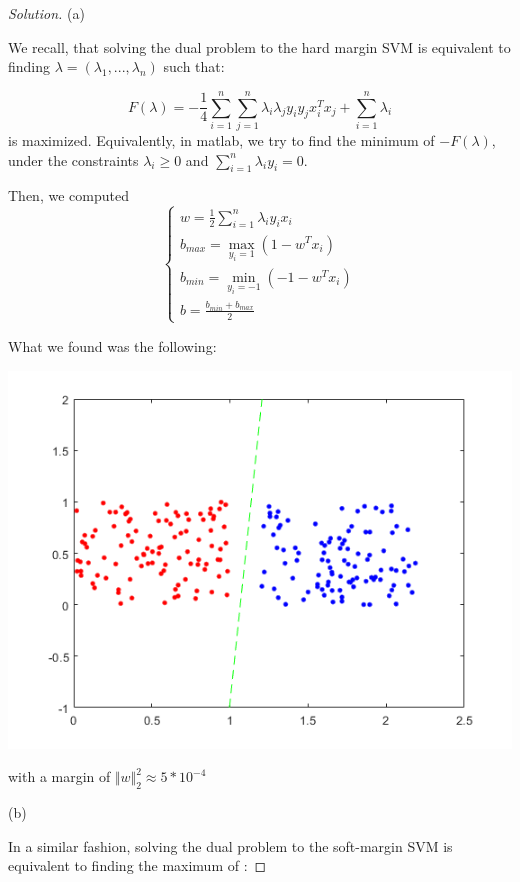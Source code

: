 \documentclass[10pt]{article}
\begin{document}
\begin{proof}[Solution]

(a) 

We recall, that solving the dual problem to the hard margin SVM is equivalent to finding $\lambda = (\lambda_1,...,\lambda_n)$ such that:

$$F( \lambda) = -\frac{1}{4} \sum_{i=1}^n \sum_{j=1}^n \lambda_i \lambda_j y_i y_j x_i^T x_j + \sum_{i=1}^n \lambda_i $$ is maximized. Equivalently, in matlab, we try to find the minimum of $-F(\lambda)$, under the constraints $\lambda_i \geq 0$ and $\sum_{i=1}^n \lambda_i y_i = 0$.

Then, we computed $$ \begin{cases} w = \frac{1}{2} \sum_{i=1}^n \lambda_i y_i x_i \\ b_{max} = \max_{y_i = 1} (1 - w^T x_i) \\ b_{min} = \min_{y_i = -1} (-1 - w^T x_i) \\ b = \frac{b_{min} + b_{max}}{2} \end{cases}$$

What we found was the following:

\begin{center}
\includegraphics[width=\linewidth]{dual_hard_svm}
\end{center}

with a margin of $ \Vert w \Vert_2^2 \approx 5*10^{-4} $

(b)

In a similar fashion, solving the dual problem to the soft-margin SVM is equivalent to finding the maximum of :


\end{proof}
\end{document}
